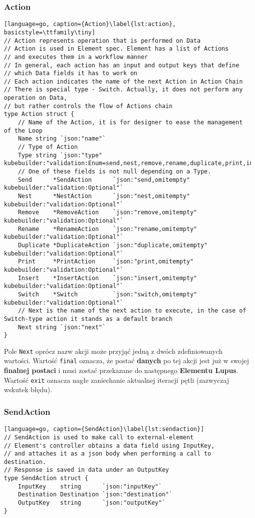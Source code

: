 \subsubsection{Action}
\begin{lstlisting}[language=go, caption={Action}\label{lst:action}, basicstyle=\ttfamily\tiny]
// Action represents operation that is performed on Data
// Action is used in Element spec. Element has a list of Actions 
// and executes them in a workflow manner
// In general, each action has an input and output keys that define 
// which Data fields it has to work on
// Each action indicates the name of the next Action in Action Chain
// There is special type - Switch. Actually, it does not perform any operation on Data, 
// but rather controls the flow of Actions chain
type Action struct {
	// Name of the Action, it is for designer to ease the management of the Loop
	Name string `json:"name"`
	// Type of Action
	Type string `json:"type" kubebuilder:"validation:Enum=send,nest,remove,rename,duplicate,print,insert,switch"`
	// One of these fields is not null depending on a Type.
	Send      *SendAction      `json:"send,omitempty" kubebuilder:"validation:Optional"`
	Nest      *NestAction      `json:"nest,omitempty" kubebuilder:"validation:Optional"`
	Remove    *RemoveAction    `json:"remove,omitempty" kubebuilder:"validation:Optional"`
	Rename    *RenameAction    `json:"rename,omitempty" kubebuilder:"validation:Optional"`
	Duplicate *DuplicateAction `json:"duplicate,omitempty" kubebuilder:"validation:Optional"`
	Print     *PrintAction     `json:"print,omitempty" kubebuilder:"validation:Optional"`
	Insert    *InsertAction    `json:"insert,omitempty" kubebuilder:"validation:Optional"`
	Switch    *Switch          `json:"switch,omitempty" kubebuilder:"validation:Optional"`
	// Next is the name of the next action to execute, in the case of Switch-type action it stands as a default branch
	Next string `json:"next"`
}
\end{lstlisting}

Pole \texttt{Next} oprócz nazw akcji może przyjąć jedną z dwóch zdefiniowanych wartości. Wartość \texttt{final} oznacza, że postać \textbf{danych} po tej akcji jest już w swojej \textbf{finalnej postaci} i musi zostać przekazane do następnego \textbf{Elementu Lupus}. Wartość \texttt{exit} oznacza nagłe zaniechanie aktualnej iteracji pętli (zazwyczaj wskutek błędu). 

\subsubsection{SendAction}
\begin{lstlisting}[language=go, caption={SendAction}\label{lst:sendaction}]
// SendAction is used to make call to external-element
// Element's controller obtains a data field using InputKey,
// and attaches it as a json body when performing a call to destination.
// Response is saved in data under an OutputKey
type SendAction struct {
	InputKey    string      `json:"inputKey"`
	Destination Destination `json:"destination"`
	OutputKey   string      `json:"outputKey"`
}
\end{lstlisting}

